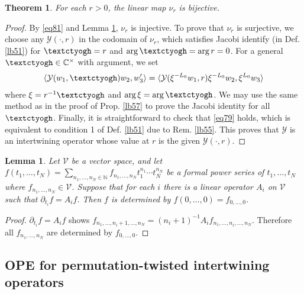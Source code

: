 \documentclass[12pt,a4paper,notitlepage]{article}
\theoremstyle{definition}
\theoremstyle{plain}
\newtheorem{thm}[df]{Theorem}
\newtheorem{lm}[df]{Lemma}
\newcommand{\mc}{\mathcal}
\newcommand{\bk}[1]{\langle {#1}\rangle}
\newcommand{\Cbb}{\mathbb C}
\newcommand{\Nbb}{\mathbb N}
\newcommand{\tipaz}{\text{\textctyogh}}
\numberwithin{equation}{subsection}
\begin{document}
\begin{thm}
For each $r>0$, the linear map $\nu_r$ is bijective.
\end{thm}


\begin{proof}
By \eqref{eq81} and Lemma \ref{lb68}, $\nu_r$ is injective. To prove that $\nu_r$ is surjective, we choose any $\mc Y(\cdot,r)$ in the codomain of $\nu_r$, which satisfies Jacobi identify (in Def. \ref{lb51}) for $\tipaz=r$ and $\arg\tipaz=\arg r=0$. For a general $\tipaz\in\Cbb^\times$ with argument, we set
\begin{align*}
\bk{\mc Y(w_1,\tipaz)w_2,w_3'}=\bk{\mc Y(\xi^{-L_0}w_1,r)\xi^{-L_0}w_2,\xi^{L_0}w_3}	
\end{align*}
where $\xi=r^{-1}\tipaz$ and $\arg\xi=\arg\tipaz$. We may use the same method as in the proof of Prop. \ref{lb57} to prove the Jacobi identity for all $\tipaz$. Finally, it is straightforward to check that \eqref{eq79} holds, which is equivalent to condition 1 of Def. \ref{lb51} due to Rem. \ref{lb55}. This proves that $\mc Y$ is an intertwining operator whose value at $r$ is the given $\mc Y(\cdot,r)$.
\end{proof}

\begin{lm}\label{lb68}
Let $\mc V$ be a vector space, and let $f(t_1,\dots,t_N)=\sum_{n_1,\dots,n_N\in\Nbb}f_{n_1,\dots,n_N}t_1^{n_1}\cdots t_N^{n_N}$ be a formal power series of $t_1,\dots,t_N$ where  $f_{n_1,\dots,n_N}\in\mc V$. Suppose that for each $i$ there is a linear operator $A_i$ on $\mc V$ such that $\partial_{t_i}f=A_if$. Then $f$ is determined by $f(0,\dots,0)=f_{0,\dots,0}$.
\end{lm}


\begin{proof}
	$\partial_{t_i}f=A_if$ shows $f_{n_1,\dots,n_i+1,\dots,n_N}=(n_i+1)^{-1}A_if_{n_1,\dots,n_i,\dots,n_N}$. Therefore all $f_{n_1,\dots,n_N}$ are determined by $f_{0,\dots,0}$.
\end{proof}




\subsection{OPE for permutation-twisted intertwining operators}\label{lb71}
\end{document}
